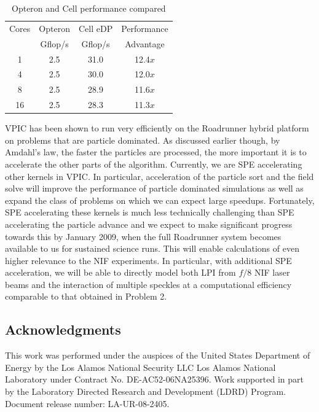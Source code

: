 \documentclass[journal,twoside]{IEEEtran}
\begin{document}
\begin{table}
\caption{Opteron and Cell performance compared}
\begin{center}
\begin{tabular}{c c c c}
\hline
\hline
Cores & Opteron & Cell eDP & Performance \\
      & Gflop/s &  Gflop/s &  Advantage  \\
\hline
    1 &     2.5 &     31.0 &     12.4$x$ \\
    4 &     2.5 &     30.0 &     12.0$x$ \\
    8 &     2.5 &     28.9 &     11.6$x$ \\
   16 &     2.5 &     28.3 &     11.3$x$ \\
\hline
\end{tabular}
\end{center}
\label{tbl:opteron-cell-compared}
\end{table}

VPIC has been shown to run very efficiently on the Roadrunner hybrid
platform on problems that are particle dominated.  As discussed
earlier though, by Amdahl's law, the faster the particles are
processed, the more important it is to accelerate the other parts of
the algorithm.  Currently, we are SPE accelerating other kernels in
VPIC.  In particular, acceleration of the particle sort and the field
solve will improve the performance of particle dominated simulations
as well as expand the class of problems on which we can expect large
speedups.  Fortunately, SPE accelerating these kernels is much less
technically challenging than SPE accelerating the particle advance and
we expect to make significant progress towards this by January 2009,
when the full Roadrunner system becomes available to us for sustained
science runs.  This will enable calculations of even higher relevance
to the NIF experiments.  In particular, with additional SPE
acceleration, we will be able to directly model both LPI from $f/8$
NIF laser beams and the interaction of multiple speckles at a
computational efficiency comparable to that obtained in Problem 2.

\subsection*{Acknowledgments}

This work was performed under the auspices of the United States
Department of Energy by the Los Alamos National Security LLC Los
Alamos National Laboratory under Contract No. DE-AC52-06NA25396.  Work
supported in part by the Laboratory Directed Research and Development
(LDRD) Program.  Document release number: LA-UR-08-2405.
\end{document}
